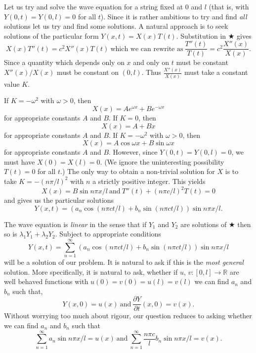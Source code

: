 \documentclass[12pt]{article}
\theoremstyle{definition}
\begin{document}
Let us try and solve the wave equation for a string
fixed at $0$ and $l$ (that is, with $Y(0,t)=Y(0,l)=0$
for all $t$). Since it is rather ambitious to try
and find \emph{all} solutions let us try and find some
solutions. A natural approach is to seek solutions
of the particular form $Y(x,t)=X(x)T(t)$. Substitution
in $\bigstar$ gives
\[X(x)T''(t)=c^{2}X''(x)T(t)
\ \text{which we can rewrite as}
\ \frac{T''(t)}{T(t)}=c^{2}\frac{X''(x)}{X(x)}.\]
Since a quantity which depends only on $x$ and
only on $t$ must be constant $X''(x)/X(x)$
must be constant on $(0,l)$. Thus 
$\frac{X''(x)}{X(x)}$ must take a constant value $K$.

If $K=-\omega^{2}$ with $\omega>0$, then
\[X(x)=Ae^{\omega x}+Be^{-\omega x}\]
for appropriate constants $A$ and $B$.
If $K=0$, then
\[X(x)=A+Bx\]
for appropriate constants $A$ and $B$.
If $K=-\omega^{2}$ with $\omega>0$, then
\[X(x)=A\cos \omega x+B\sin \omega x\]
for appropriate constants $A$ and $B$.
However, since $Y(0,t)=Y(0,l)=0$,
we must have $X(0)=X(l)=0$. (We ignore the
uninteresting possibility $T(t)=0$ for all $t$.)
The only way to obtain a non-trivial solution
for $X$ is to take $K=-(n\pi/l)^{2}$ with $n$
a strictly positive integer. This yields
\[X(x)=B\sin{n\pi x/l}
\ \text{and}\ T''(t)+(n\pi c/l)^{2}T(t)=0\]
and gives us the particular solutions
\[Y(x,t)=(a_{n}\cos(n\pi ct/l)+b_{n}\sin(n\pi ct/l))
\sin{n\pi x/l}.\]

The wave equation is \emph{linear} in the sense that
if $Y_{1}$ and $Y_{2}$ are solutions of $\bigstar$
then so is $\lambda_{1}Y_{1}+\lambda_{2}Y_{2}$.
Subject to appropriate conditions 
\[Y(x,t)=\sum_{n=1}^{\infty}
(a_{n}\cos(n\pi ct/l)+b_{n}\sin(n\pi ct/l))
\sin{n\pi x/l}\]
will be a solution of our problem. It is natural
to ask if this is the \emph{most general} solution.
More specifically, it is natural to ask, whether
if $u,\,v:[0,l]\rightarrow{\mathbb R}$
are well behaved functions with $u(0)=v(0)=u(l)=v(l)$
we can find $a_{n}$ and $b_{n}$ such that,
\[Y(x,0)=u(x)\ \text{and}\ \frac{\partial Y}{\partial t}(x,0)=v(x).\]
Without worrying too much about rigour, our question reduces to
asking whether we can find $a_{n}$ and $b_{n}$
such that
\[\sum_{n=1}^{\infty}a_{n}\sin{n\pi x/l}=u(x)
\ \text{and}
\ \sum_{n=1}^{\infty}\frac{n\pi c}{l}b_{n}\sin{n\pi x/l}=v(x).\]
\end{document}
